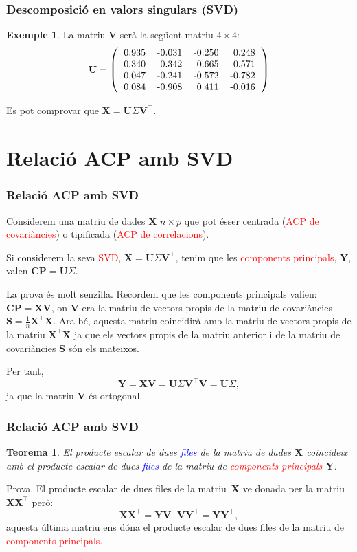 \documentclass[12pt,t]{beamer}
\newcommand{\red}[1]{\textcolor{red}{#1}}
\newcommand{\blue}[1]{\textcolor{blue}{#1}}
\theoremstyle{plain}
\newtheorem{teorema}{Teorema}
\theoremstyle{definition}
\newtheorem{exemple}{Exemple}
\begin{document}
\begin{frame}
\frametitle{Descomposició en valors singulars (SVD)}
\begin{exemple}
La matriu $\mathbf{V}$ serà la següent matriu $4\times 4$:
\[
\mathbf{U} =\left(
\begin{tabular}{rrrr}
  0.935 & -0.031 & -0.250 & 0.248 \\ 
  0.340 & 0.342 & 0.665 & -0.571 \\ 
  0.047 & -0.241 & -0.572 & -0.782 \\ 
  0.084 & -0.908 & 0.411 & -0.016 \\ 
  \end{tabular}\right)
\]

Es pot comprovar que $\mathbf{X}=\mathbf{U}\Sigma\mathbf{V}^\top$.
\end{exemple}
\end{frame}

\section{Relació  ACP amb SVD}

\begin{frame}
\frametitle{Relació ACP amb SVD}
Considerem una matriu de dades $\mathbf{X}$ $n\times p$ que pot ésser centrada (\red{ACP de covariàncies}) o tipificada (\red{ACP de correlacions}).
\medskip

Si considerem la seva \red{SVD}, $\mathbf{X}=\mathbf{U}\Sigma\mathbf{V}^\top$, tenim que les \red{components principals}, $\mathbf{Y}$, valen $\mathbf{CP}=\mathbf{U}\Sigma$.
\medskip

{\footnotesize
La prova és molt senzilla. Recordem que les components principals valien: $\mathbf{CP}=\mathbf{X}\mathbf{V}$, on $\mathbf{V}$ era la matriu de vectors propis de la matriu de covariàncies $\mathbf{S}=\frac{1}{n}\mathbf{X}^\top\mathbf{X}$. Ara bé, aquesta matriu coincidirà amb la matriu de vectors propis de la matriu $\mathbf{X}^\top\mathbf{X}$ ja que els vectors propis de la matriu anterior i de la matriu de covariàncies $\mathbf{S}$ són els mateixos.

Per tant, 
$$\mathbf{Y}=\mathbf{X}\mathbf{V}=\mathbf{U}\Sigma\mathbf{V}^\top\mathbf{V}=\mathbf{U}\Sigma,$$
ja que la matriu $\mathbf{V}$ és ortogonal.}
\end{frame}

\begin{frame}
\frametitle{Relació ACP amb SVD}
\begin{teorema}
El producte escalar de dues \blue{files} de la matriu de dades $\mathbf{X}$ coincideix amb el producte escalar de dues \blue{files} de la matriu de  \red{components principals} $\mathbf{Y}$.
\end{teorema}
{\footnotesize
Prova. El producte escalar de dues files de la matriu~$\mathbf{X}$ ve donada per la matriu $\mathbf{X}\mathbf{X}^\top$ però:
\[
\mathbf{X}\mathbf{X}^\top = \mathbf{Y}\mathbf{V}^\top\mathbf{V}\mathbf{Y}^\top =\mathbf{Y}\mathbf{Y}^\top,
\]
aquesta última matriu ens dóna el producte escalar de dues files de la matriu de \red{components principals.}
}
\end{frame}
\end{document}
